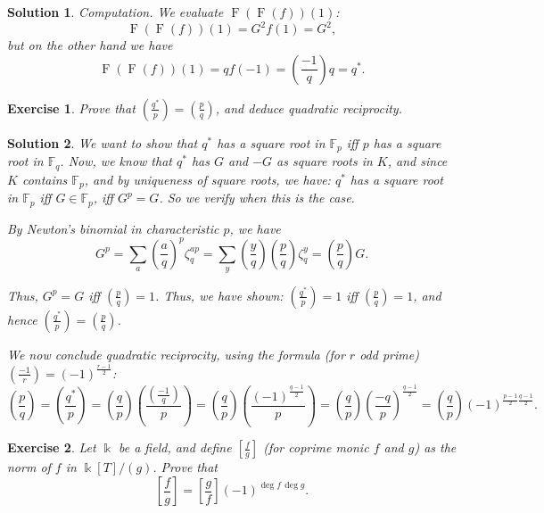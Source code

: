 \documentclass{article}
\newtheorem{ex}{Exercise}
\theoremstyle{nonumberplain}
\newtheorem{sol}{Solution}
\newcommand{\FF}{\mathbb{F}}
\newcommand{\kk}{\Bbbk}
\DeclareMathOperator{\Fr}{F}
\newcommand{\legendre}[2]{\genfrac{(}{)}{}{}{#1}{#2}}
\newcommand{\blegendre}[2]{\genfrac{[}{]}{}{}{#1}{#2}}
\begin{document}
\begin{sol}
Computation. We evaluate $\Fr(\Fr(f))(1)$:
\begin{equation}
\Fr(\Fr(f))(1) = G^2 f(1) = G^2,
\end{equation}
but on the other hand we have
\begin{equation}
\Fr(\Fr(f))(1) = q f(-1) = \legendre{-1}q q = q^*.
\end{equation}
\end{sol}

\begin{ex}
Prove that $\legendre{q^*}p = \legendre p q$, and deduce quadratic reciprocity.
\end{ex}

\begin{sol}
We want to show that $q^*$ has a square root in $\FF_p$ iff $p$ has a square root in $\FF_q$. Now, we know that $q^*$ has $G$ and $-G$ as square roots in $K$, and since $K$ contains $\FF_p$, and by uniqueness of square roots, we have: $q^*$ has a square root in $\FF_p$ iff $G \in \FF_p$, iff $G^p = G$. So we verify when this is the case.

By Newton's binomial in characteristic $p$, we have
\begin{equation}
G^p = \sum_a \legendre aq ^p \zeta_q^{ap} = \sum_y \legendre y q \legendre p q \zeta_q^y = \legendre p q G.
\end{equation}

Thus, $G^p = G$ iff $\legendre p q = 1$. Thus, we have shown: $\legendre{q^*}p = 1$ iff $\legendre p q = 1$, and hence $\legendre{q^*}p = \legendre p q$.

We now conclude quadratic reciprocity, using the formula (for $r$ odd prime) $\legendre{-1}r = (-1)^{\frac{r-1}2}$:
\begin{equation}
\legendre p q = \legendre{q^*}p = \legendre q p \legendre{\legendre{-1}q}p = \legendre q p \legendre{(-1)^{\frac{q-1}2}}p = \legendre q p \legendre{-q}p^{\frac{q-1}2} = \legendre q p (-1)^{\frac{p-1}2 \frac{q-1}2}.
\end{equation}
\end{sol}

\begin{ex}
Let $\kk$ be a field, and define $\blegendre f g$ (for coprime monic $f$ and $g$) as the norm of $f$ in $\kk[T]/(g)$. Prove that
\begin{equation}
\blegendre f g = \blegendre g f (-1)^{\deg f \, \deg g}.
\end{equation}
\end{ex}
\end{document}
